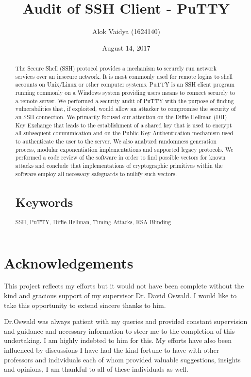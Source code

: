\documentclass{bhamthesis}
\title {Audit of SSH Client - PuTTY}
\author{Alok Vaidya (1624140)}
\date{August 14, 2017}
\begin{document}
\maketitle
\tableofcontents
\begin{abstract}
The Secure Shell (SSH) protocol provides a mechanism to securely run network services over an insecure network. It is most commonly used for remote logins to shell accounts on Unix/Linux or other computer systems. PuTTY is an SSH client program running commonly on a Windows system providing users means to connect securely to a remote server. We performed a security audit of PuTTY with the purpose of finding vulnerabilities that, if exploited, would allow an attacker to compromise the security of an SSH connection. We primarily focused our attention on the Diffie-Hellman (DH) Key Exchange that leads to the establishment of a shared key that is used to encrypt all subsequent communication and on the Public Key Authentication mechanism used to authenticate the user to the server. We also analyzed randomness generation process, modular exponentiation implementations and supported legacy protocols. We performed a code review of the software in order to find possible vectors for known attacks and conclude that implementations of cryptographic primitives within the software employ all necessary safeguards to nullify such vectors.
\section*{Keywords}
SSH, PuTTY, Diffie-Hellman, Timing Attacks, RSA Blinding
\end{abstract}
\section*{Acknowledgements}
This project reflects my efforts but it would not have been complete without the kind and gracious support of my supervisor Dr. David Oswald. I would like to take this opportunity to extend sincere thanks to him.\par
Dr.Oswald was always patient with my queries and provided constant supervision and guidance and necessary information to steer me to the completion of this undertaking. I am highly indebted to him for this. My efforts have also been influenced by discussions I have had the kind fortune to have with other professors and individuals each of whom provided valuable suggestions, insights and opinions, I am thankful to all of these individuals as well.
\end{document}
